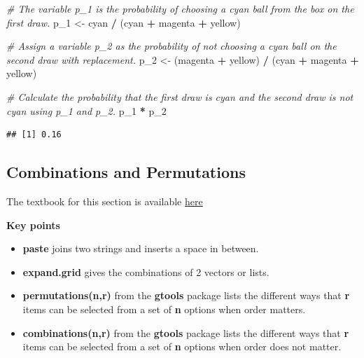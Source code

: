 \documentclass[
]{article}
\newenvironment{Shaded}{\begin{snugshade}}{\end{snugshade}}
\newcommand{\CommentTok}[1]{\textcolor[rgb]{0.56,0.35,0.01}{\textit{#1}}}
\newcommand{\DecValTok}[1]{\textcolor[rgb]{0.00,0.00,0.81}{#1}}
\newcommand{\NormalTok}[1]{#1}
\newcommand{\OperatorTok}[1]{\textcolor[rgb]{0.81,0.36,0.00}{\textbf{#1}}}
\newcommand{\StringTok}[1]{\textcolor[rgb]{0.31,0.60,0.02}{#1}}
\providecommand{\tightlist}{%
  \setlength{\itemsep}{0pt}\setlength{\parskip}{0pt}}
\begin{document}
\begin{Shaded}
\begin{Highlighting}[]
\CommentTok{\# The variable \textquotesingle{}p\_1\textquotesingle{} is the probability of choosing a cyan ball from the box on the first draw.}
\NormalTok{p\_}\DecValTok{1}\NormalTok{ \textless{}{-}}\StringTok{ }\NormalTok{cyan }\OperatorTok{/}\StringTok{ }\NormalTok{(cyan }\OperatorTok{+}\StringTok{ }\NormalTok{magenta }\OperatorTok{+}\StringTok{ }\NormalTok{yellow)}

\CommentTok{\# Assign a variable \textquotesingle{}p\_2\textquotesingle{} as the probability of not choosing a cyan ball on the second draw with replacement.}
\NormalTok{p\_}\DecValTok{2}\NormalTok{ \textless{}{-}}\StringTok{ }\NormalTok{(magenta }\OperatorTok{+}\StringTok{ }\NormalTok{yellow) }\OperatorTok{/}\StringTok{ }\NormalTok{(cyan }\OperatorTok{+}\StringTok{ }\NormalTok{magenta }\OperatorTok{+}\StringTok{ }\NormalTok{yellow)}

\CommentTok{\# Calculate the probability that the first draw is cyan and the second draw is not cyan using \textasciigrave{}p\_1\textasciigrave{} and \textasciigrave{}p\_2\textasciigrave{}.}
\NormalTok{p\_}\DecValTok{1}  \OperatorTok{*}\StringTok{ }\NormalTok{p\_}\DecValTok{2}
\end{Highlighting}
\end{Shaded}

\begin{verbatim}
## [1] 0.16
\end{verbatim}

\hypertarget{combinations-and-permutations}{%
\subsection{Combinations and
Permutations}\label{combinations-and-permutations}}

The textbook for this section is available
\href{https://rafalab.github.io/dsbook/probability.html\#combinations-and-permutations}{here}

\textbf{Key points}

\begin{itemize}
\tightlist
\item
  \textbf{paste} joins two strings and inserts a space in between.
\item
  \textbf{expand.grid} gives the combinations of 2 vectors or lists.
\item
  \textbf{permutations(n,r)} from the \textbf{gtools} package lists the
  different ways that \textbf{r} items can be selected from a set of
  \textbf{n} options when order matters.
\item
  \textbf{combinations(n,r)} from the \textbf{gtools} package lists the
  different ways that \textbf{r} items can be selected from a set of
  \textbf{n} options when order does not matter.
\end{itemize}
\end{document}
